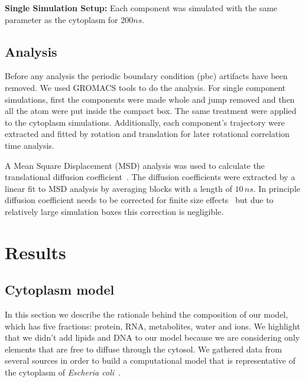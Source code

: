 \documentclass[journal=jacsat,manuscript=article]{achemso}
\begin{document}
{\bf Single Simulation Setup: } Each component was simulated with the same parameter as the cytoplasm for $200 ns$.

\subsection*{Analysis}
Before any analysis the periodic boundary condition (pbc) artifacts have been removed. We used GROMACS tools to do the analysis. For single component simulations, first the components were made whole and jump removed and then all the atom were put inside the compact box. The same treatment were applied to the cytoplasm simulations. Additionally, each component's trajectory were extracted and fitted by rotation and translation for later rotational correlation time analysis. 


A Mean Square Displacement (MSD) analysis was used to calculate the translational diffusion coefficient~\cite{Allen1987a}. The diffusion coefficients were extracted by a linear fit to MSD analysis by averaging blocks with a length of $10 \,ns$. In principle diffusion coefficient needs to be corrected for finite size effects~\cite{Yeh2004} but due to relatively large simulation boxes this correction is negligible.




\section*{Results}

\subsection{Cytoplasm model}
In this section we describe the rationale behind the composition of our model, which has five fractions: protein, RNA, metabolites, water and ions. We highlight that we didn't add lipids and DNA to our model because we are considering only elements that are free to diffuse through the cytosol. We gathered data from several sources in order to build a computational model that is representative of the cytoplasm of {\em Escheria coli}~\cite{Dong1996,Bennett2009,Link1997,Mcguffee2010}.
\end{document}

